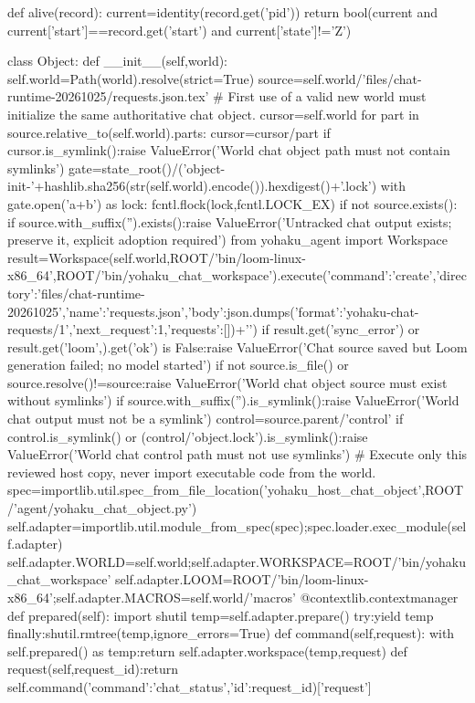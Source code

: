 def alive(record):
    current=identity(record.get('pid'))
    return bool(current and current['start']==record.get('start') and current['state']!='Z')


class Object:
    def __init__(self,world):
        self.world=Path(world).resolve(strict=True)
        source=self.world/'files/chat-runtime-20261025/requests.json.tex'
        # First use of a valid new world must initialize the same authoritative chat object.
        cursor=self.world
        for part in source.relative_to(self.world).parts:
            cursor=cursor/part
            if cursor.is_symlink():raise ValueError('World chat object path must not contain symlinks')
        gate=state_root()/('object-init-'+hashlib.sha256(str(self.world).encode()).hexdigest()+'.lock')
        with gate.open('a+b') as lock:
            fcntl.flock(lock,fcntl.LOCK_EX)
            if not source.exists():
                if source.with_suffix('').exists():raise ValueError('Untracked chat output exists; preserve it, explicit adoption required')
                from yohaku_agent import Workspace
                result=Workspace(self.world,ROOT/'bin/loom-linux-x86_64',ROOT/'bin/yohaku_chat_workspace').execute({'command':'create','directory':'files/chat-runtime-20261025','name':'requests.json','body':json.dumps({'format':'yohaku-chat-requests/1','next_request':1,'requests':[]})+'\n'})
                if result.get('sync_error') or result.get('loom',{}).get('ok') is False:raise ValueError('Chat source saved but Loom generation failed; no model started')
        if not source.is_file() or source.resolve()!=source:raise ValueError('World chat object source must exist without symlinks')
        if source.with_suffix('').is_symlink():raise ValueError('World chat output must not be a symlink')
        control=source.parent/'control'
        if control.is_symlink() or (control/'object.lock').is_symlink():raise ValueError('World chat control path must not use symlinks')
        # Execute only this reviewed host copy, never import executable code from the world.
        spec=importlib.util.spec_from_file_location('yohaku_host_chat_object',ROOT/'agent/yohaku_chat_object.py')
        self.adapter=importlib.util.module_from_spec(spec);spec.loader.exec_module(self.adapter)
        self.adapter.WORLD=self.world;self.adapter.WORKSPACE=ROOT/'bin/yohaku_chat_workspace'
        self.adapter.LOOM=ROOT/'bin/loom-linux-x86_64';self.adapter.MACROS=self.world/'macros'
    @contextlib.contextmanager
    def prepared(self):
        import shutil
        temp=self.adapter.prepare()
        try:yield temp
        finally:shutil.rmtree(temp,ignore_errors=True)
    def command(self,request):
        with self.prepared() as temp:return self.adapter.workspace(temp,request)
    def request(self,request_id):return self.command({'command':'chat_status','id':request_id})['request']


